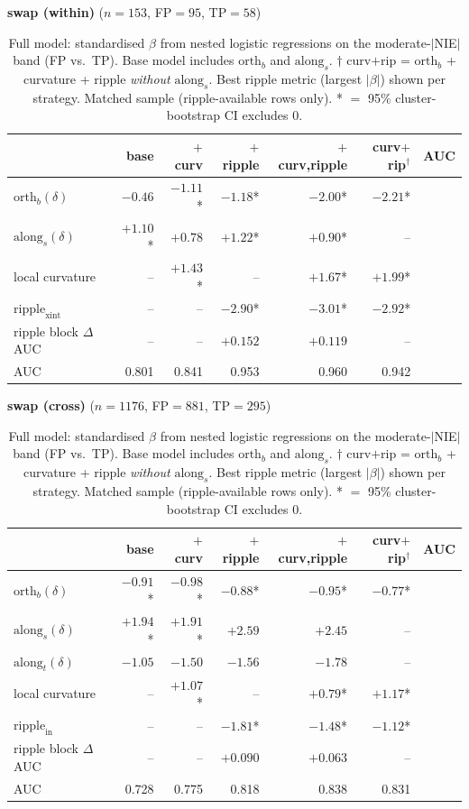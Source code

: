 \begin{table}[t]
\centering
\caption{Full model: standardised $\beta$ from nested logistic regressions on the moderate-$|$NIE$|$ band (FP vs.\ TP). Base model includes $\mathrm{orth}_b$ and $\mathrm{along}_s$. $\dagger$ curv$+$rip = $\mathrm{orth}_b$ + curvature + ripple \emph{without} $\mathrm{along}_s$. Best ripple metric (largest $|\beta|$) shown per strategy. Matched sample (ripple-available rows only). * $=$ 95\% cluster-bootstrap CI excludes 0.}
\label{tab:full-model}
\small

\medskip
\textbf{swap (within)} ($n=153$, FP$=95$, TP$=58$)

\begin{tabular}{l r r r r r r}
\toprule
 & base & $+$curv & $+$ripple & $+$curv,ripple & curv$+$rip$^\dagger$ & AUC \\
\midrule
$\mathrm{orth}_b(\delta)$ & $-0.46$ & $-1.11$* & $-1.18$* & $-2.00$* & $-2.21$* &  \\
$\mathrm{along}_s(\delta)$ & $+1.10$* & $+0.78$ & $+1.22$* & $+0.90$* & -- &  \\
local curvature & -- & $+1.43$* & -- & $+1.67$* & $+1.99$* &  \\
$\mathrm{ripple}_\mathrm{xint}$ & -- & -- & $-2.90$* & $-3.01$* & $-2.92$* &  \\
ripple block $\Delta$AUC & -- & -- & $+0.152$ & $+0.119$ & -- &  \\
AUC & 0.801 & 0.841 & 0.953 & 0.960 & 0.942 &  \\
\bottomrule
\end{tabular}

\medskip
\textbf{swap (cross)} ($n=1176$, FP$=881$, TP$=295$)

\begin{tabular}{l r r r r r r}
\toprule
 & base & $+$curv & $+$ripple & $+$curv,ripple & curv$+$rip$^\dagger$ & AUC \\
\midrule
$\mathrm{orth}_b(\delta)$ & $-0.91$* & $-0.98$* & $-0.88$* & $-0.95$* & $-0.77$* &  \\
$\mathrm{along}_s(\delta)$ & $+1.94$* & $+1.91$* & $+2.59$ & $+2.45$ & -- &  \\
$\mathrm{along}_t(\delta)$ & $-1.05$ & $-1.50$ & $-1.56$ & $-1.78$ & -- &  \\
local curvature & -- & $+1.07$* & -- & $+0.79$* & $+1.17$* &  \\
$\mathrm{ripple}_\mathrm{in}$ & -- & -- & $-1.81$* & $-1.48$* & $-1.12$* &  \\
ripple block $\Delta$AUC & -- & -- & $+0.090$ & $+0.063$ & -- &  \\
AUC & 0.728 & 0.775 & 0.818 & 0.838 & 0.831 &  \\
\bottomrule
\end{tabular}


\end{table}
